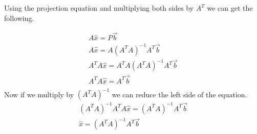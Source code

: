 				Using the projection equation and multiplying both sides by $A^T$ we can get the following.

				\begin{gather*}
				    A\hat{x}=P\vec{b}\\
				    A\hat{x}=A(A^TA)^{-1}A^T\vec{b} \\
				    A^TA\hat{x}=A^TA(A^TA)^{-1}A^T\vec{b} \\
				    A^TA\hat{x}=A^T\vec{b} \\
				\end{gather*}
				Now if we multiply by $(A^TA)^{-1}$ we can reduce the left side of the equation.
				\begin{gather*}
				    (A^TA)^{-1}A^TA\hat{x}=(A^TA)^{-1}A^T\vec{b} \\
				    \hat{x}=(A^TA)^{-1}A^T\vec{b}
				\end{gather*}

